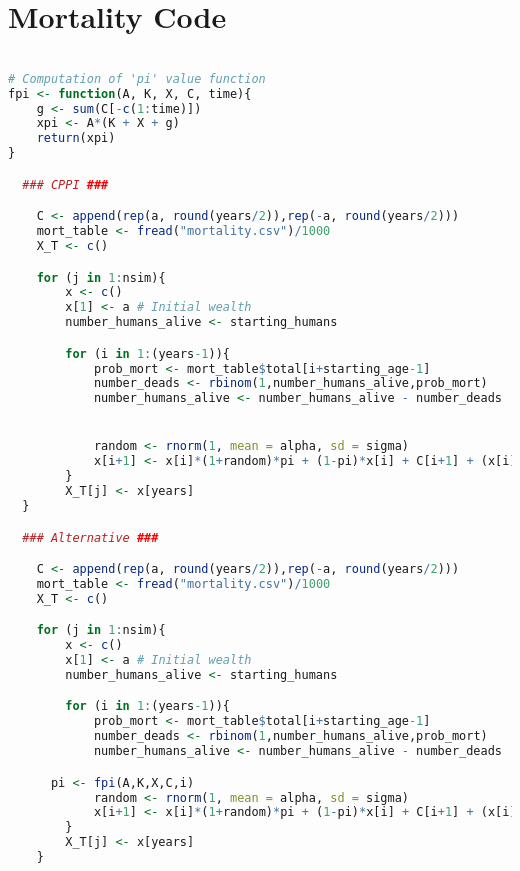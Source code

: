 \section{Mortality Code}\label{ap:mort-code}

\begin{lstlisting}[language = R]

# Computation of 'pi' value function
fpi <- function(A, K, X, C, time){
	g <- sum(C[-c(1:time)])
	xpi <- A*(K + X + g)
	return(xpi)
}

  ### CPPI ###

	C <- append(rep(a, round(years/2)),rep(-a, round(years/2)))
	mort_table <- fread("mortality.csv")/1000
	X_T <- c()

	for (j in 1:nsim){
		x <- c()
		x[1] <- a # Initial wealth
		number_humans_alive <- starting_humans

		for (i in 1:(years-1)){
			prob_mort <- mort_table$total[i+starting_age-1]
			number_deads <- rbinom(1,number_humans_alive,prob_mort)
			number_humans_alive <- number_humans_alive - number_deads


			random <- rnorm(1, mean = alpha, sd = sigma)
			x[i+1] <- x[i]*(1+random)*pi + (1-pi)*x[i] + C[i+1] + (x[i]*number_deads/number_humans_alive)*w
		}
		X_T[j] <- x[years]
  }

  ### Alternative ###

	C <- append(rep(a, round(years/2)),rep(-a, round(years/2)))
	mort_table <- fread("mortality.csv")/1000
	X_T <- c()

	for (j in 1:nsim){
		x <- c()
		x[1] <- a # Initial wealth
		number_humans_alive <- starting_humans

		for (i in 1:(years-1)){
			prob_mort <- mort_table$total[i+starting_age-1]
			number_deads <- rbinom(1,number_humans_alive,prob_mort)
			number_humans_alive <- number_humans_alive - number_deads

      pi <- fpi(A,K,X,C,i)
			random <- rnorm(1, mean = alpha, sd = sigma)
			x[i+1] <- x[i]*(1+random)*pi + (1-pi)*x[i] + C[i+1] + (x[i]*number_deads/number_humans_alive)*w
		}
		X_T[j] <- x[years]
	}
\end{lstlisting}
